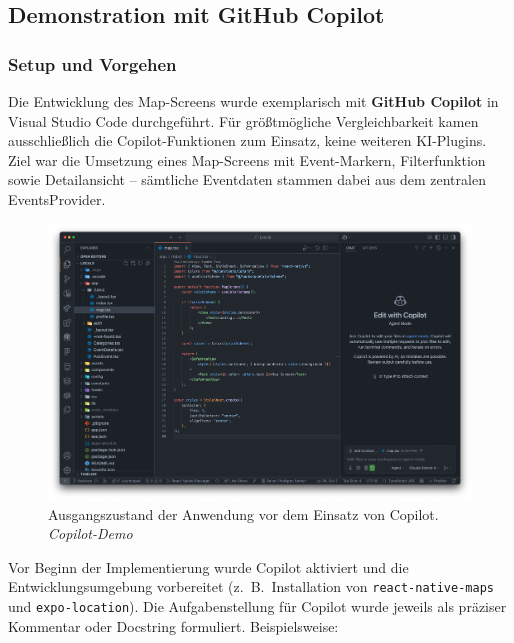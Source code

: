 
\subsection{Demonstration mit GitHub Copilot}

\subsubsection{Setup und Vorgehen}
Die Entwicklung des Map-Screens wurde exemplarisch mit \textbf{GitHub Copilot}
in Visual Studio Code durchgeführt. Für größtmögliche Vergleichbarkeit kamen
ausschließlich die Copilot-Funktionen zum Einsatz, keine weiteren KI-Plugins.
Ziel war die Umsetzung eines Map-Screens mit Event-Markern, Filterfunktion
sowie Detailansicht – sämtliche Eventdaten stammen dabei aus dem zentralen
EventsProvider.

\begin{figure}[htbp]
      \centering
      \includegraphics[width=1\textwidth]{images/copilot_screenshots/Screenshots Ist-Zustand-copilot.png}
      \caption{Ausgangszustand der Anwendung vor dem Einsatz von Copilot. \textit{Copilot-Demo}}
      \label{fig:copilot-istzustand}
\end{figure}

Vor Beginn der Implementierung wurde Copilot aktiviert und die
Entwicklungsumgebung vorbereitet (z.~B.\ Installation von
\texttt{react-native-maps} und \texttt{expo-location}). Die Aufgabenstellung
für Copilot wurde jeweils als präziser Kommentar oder Docstring formuliert.
Beispielsweise:

